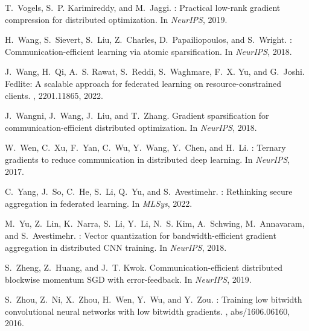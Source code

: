 \documentclass[11pt]{article}
\newcommand{\graham}[1]{{\color{green}Graham: #1}}
\begin{document}
\begin{thebibliography}{10}
\begin{small}
T.~Vogels, S.~P. Karimireddy, and M.~Jaggi.
: Practical low-rank gradient compression for distributed
  optimization.
\newblock In {\em NeurIPS}, 2019.

H.~Wang, S.~Sievert, S.~Liu, Z.~Charles, D.~Papailiopoulos, and S.~Wright.
: Communication-efficient learning via atomic sparsification.
\newblock In {\em NeurIPS}, 2018.

J.~Wang, H.~Qi, A.~S. Rawat, S.~Reddi, S.~Waghmare, F.~X. Yu, and G.~Joshi.
\newblock Fedlite: A scalable approach for federated learning on
  resource-constrained clients.
, 2201.11865, 2022.

J.~Wangni, J.~Wang, J.~Liu, and T.~Zhang.
\newblock Gradient sparsification for communication-efficient distributed
  optimization.
\newblock In {\em NeurIPS}, 2018.

W.~Wen, C.~Xu, F.~Yan, C.~Wu, Y.~Wang, Y.~Chen, and H.~Li.
: Ternary gradients to reduce communication in distributed
  deep learning.
\newblock In {\em NeurIPS}, 2017.

C.~Yang, J.~So, C.~He, S.~Li, Q.~Yu, and S.~Avestimehr.
: Rethinking secure aggregation in federated learning.
\newblock In {\em MLSys}, 2022.

M.~Yu, Z.~Lin, K.~Narra, S.~Li, Y.~Li, N.~S. Kim, A.~Schwing, M.~Annavaram, and
  S.~Avestimehr.
: Vector quantization for bandwidth-efficient gradient
  aggregation in distributed {CNN} training.
\newblock In {\em NeurIPS}, 2018.

S.~Zheng, Z.~Huang, and J.~T. Kwok.
\newblock Communication-efficient distributed blockwise momentum {SGD} with
  error-feedback.
\newblock In {\em NeurIPS}, 2019.

S.~Zhou, Z.~Ni, X.~Zhou, H.~Wen, Y.~Wu, and Y.~Zou.
: Training low bitwidth convolutional neural networks
  with low bitwidth gradients.
, abs/1606.06160, 2016.
\end{small}
\end{thebibliography}


%


\end{document}
